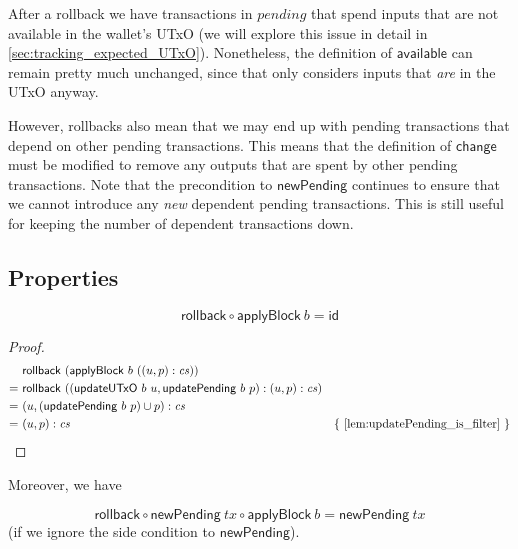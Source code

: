 \documentclass{article}
\theoremstyle{definition}{
  \newtheorem{lemma}{Lemma}[section] %
  \newtheorem{definition}[lemma]{Definition}
}
\theoremstyle{theorem}{
  \newtheorem{invariant}[lemma]{Invariant}
  \newtheorem{proofobligation}[lemma]{Proof Obligation}
}
\numberwithin{equation}{lemma}
\begin{document}
After a rollback we have transactions in $\mathit{pending}$ that spend inputs
that are not available in the wallet's UTxO (we will explore this issue in detail in
\cref{sec:tracking_expected_UTxO}). Nonetheless, the definition of $\mathsf{available}$ can
remain pretty much unchanged, since that only considers inputs that \emph{are}
in the UTxO anyway.

However, rollbacks also mean that we may end up with pending transactions that
depend on other pending transactions. This means that the definition of
$\mathsf{change}$ must be modified to remove any outputs that are spent by other
pending transactions. Note that the precondition to $\mathsf{newPending}$
continues to ensure that we cannot introduce any \emph{new} dependent pending
transactions. This is still useful for keeping the number of dependent
transactions down.

\subsection{Properties}

\begin{lemma} \label{lem:rollback_applyBlock_id}
\begin{equation*}
\mathsf{rollback} \circ \mathsf{applyBlock} ~ b = \mathsf{id}
\end{equation*}
\end{lemma}

\begin{proof}
\begin{align*}
    & \mathsf{rollback} ~ (\mathsf{applyBlock} ~ b ~ ((u, p) : \mathit{cs})) \\
= ~ & \mathsf{rollback} ~ (( \mathsf{updateUTxO} ~ b ~ u
         , \mathsf{updatePending} ~ b ~ p
         )
         : (u, p) : \mathit{cs}
         ) \\
= ~ & (u, (\mathsf{updatePending} ~ b ~ p) \cup p) : \mathit{cs} \\
= ~ & (u, p) : \mathit{cs} & \text{\{ \cref{lem:updatePending_is_filter} \}}
\end{align*}
\end{proof}

Moreover, we have

\begin{lemma}
\begin{equation*}
\mathsf{rollback} \circ \mathsf{newPending} ~ \mathit{tx} \circ \mathsf{applyBlock} ~ b
= \mathsf{newPending} ~ \mathit{tx}
\end{equation*}
(if we ignore the side condition to $\mathsf{newPending}$).
\end{lemma}
\end{document}
